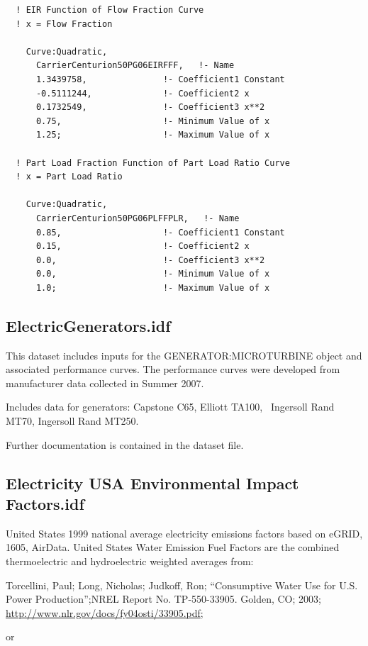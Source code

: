 \begin{lstlisting}
  ! EIR Function of Flow Fraction Curve
  ! x = Flow Fraction

    Curve:Quadratic,
      CarrierCenturion50PG06EIRFFF,   !- Name
      1.3439758,               !- Coefficient1 Constant
      -0.5111244,              !- Coefficient2 x
      0.1732549,               !- Coefficient3 x**2
      0.75,                    !- Minimum Value of x
      1.25;                    !- Maximum Value of x

  ! Part Load Fraction Function of Part Load Ratio Curve
  ! x = Part Load Ratio

    Curve:Quadratic,
      CarrierCenturion50PG06PLFFPLR,   !- Name
      0.85,                    !- Coefficient1 Constant
      0.15,                    !- Coefficient2 x
      0.0,                     !- Coefficient3 x**2
      0.0,                     !- Minimum Value of x
      1.0;                     !- Maximum Value of x
\end{lstlisting}

\subsection{ElectricGenerators.idf}\label{electricgenerators.idf}

This dataset includes inputs for the GENERATOR:MICROTURBINE object and associated performance curves. The performance curves were developed from manufacturer data collected in Summer 2007.

Includes data for generators: Capstone C65, Elliott TA100,~ Ingersoll Rand MT70, Ingersoll Rand MT250.

Further documentation is contained in the dataset file.

\subsection{Electricity USA Environmental Impact Factors.idf}\label{electricity-usa-environmental-impact-factors.idf}

United States 1999 national average electricity emissions factors based on eGRID, 1605, AirData. United States Water Emission Fuel Factors are the combined thermoelectric and hydroelectric weighted averages from:

Torcellini, Paul; Long, Nicholas; Judkoff, Ron; ``Consumptive Water Use for U.S. Power Production'';NREL Report No. TP-550-33905. Golden, CO; 2003; \url{http://www.nlr.gov/docs/fy04osti/33905.pdf};

or

